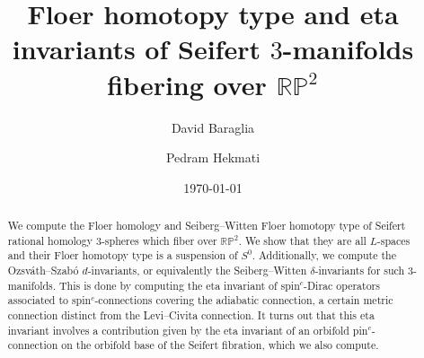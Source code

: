 \documentclass{amsart}
\theoremstyle{definition}
\theoremstyle{remark}
\numberwithin{equation}{section}
\begin{document}
\setlength\parskip{0.5em plus 0.1em minus 0.2em}

\title[Floer homotopy type and eta invariants of Seifert $3$-manifolds]{Floer homotopy type and eta invariants of Seifert $3$-manifolds fibering over $\mathbb{RP}^2$}

\author{David Baraglia}
\address{School of Mathematical Sciences, Adelaide University, Adelaide SA 5005, Australia}

\author{Pedram Hekmati}
\address{Department of Mathematics, The University of Auckland, Auckland, 1010, New Zealand}



\date{\today}


\begin{abstract}

We compute the Floer homology and Seiberg--Witten Floer homotopy type of Seifert rational homology $3$-spheres which fiber over $\mathbb{RP}^2$. We show that they are all $L$-spaces and their Floer homotopy type is a suspension of $S^0$. Additionally, we compute the Ozsv\'ath--Szab\'o $d$-invariants, or equivalently the Seiberg--Witten $\delta$-invariants for such $3$-manifolds. This is done by computing the eta invariant of spin$^c$-Dirac operators associated to spin$^c$-connections covering the adiabatic connection, a certain metric connection distinct from the Levi--Civita connection. It turns out that this eta invariant involves a contribution given by the eta invariant of an orbifold pin$^c$-connection on the orbifold base of the Seifert fibration, which we also compute.

\end{abstract}

\maketitle

\end{document}
